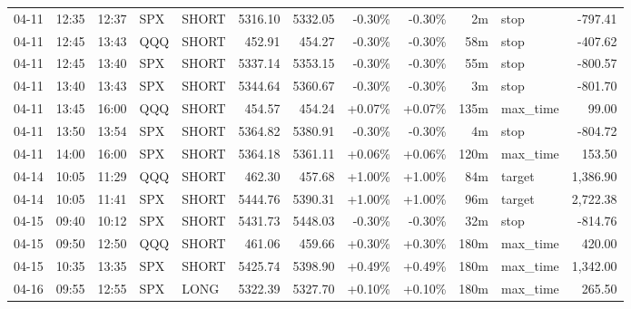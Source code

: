 \documentclass[11pt,a4paper,twoside]{article}
\begin{document}
\begin{center}
\begin{longtable}{>{\color{txtmain}}l l l l l r r r r r >{\color{txtmain}}l r}
04-11 & 12:35 & 12:37 & SPX & SHORT & 5316.10 & 5332.05 & \textcolor{lossred}{-0.30\%} & \textcolor{lossred}{-0.30\%} & 2m & stop & \textcolor{lossred}{-797.41} \\
04-11 & 12:45 & 13:43 & QQQ & SHORT & 452.91 & 454.27 & \textcolor{lossred}{-0.30\%} & \textcolor{lossred}{-0.30\%} & 58m & stop & \textcolor{lossred}{-407.62} \\
04-11 & 12:45 & 13:40 & SPX & SHORT & 5337.14 & 5353.15 & \textcolor{lossred}{-0.30\%} & \textcolor{lossred}{-0.30\%} & 55m & stop & \textcolor{lossred}{-800.57} \\
04-11 & 13:40 & 13:43 & SPX & SHORT & 5344.64 & 5360.67 & \textcolor{lossred}{-0.30\%} & \textcolor{lossred}{-0.30\%} & 3m & stop & \textcolor{lossred}{-801.70} \\
04-11 & 13:45 & 16:00 & QQQ & SHORT & 454.57 & 454.24 & \textcolor{wingreen}{+0.07\%} & \textcolor{wingreen}{+0.07\%} & 135m & max\_time & \textcolor{wingreen}{99.00} \\
04-11 & 13:50 & 13:54 & SPX & SHORT & 5364.82 & 5380.91 & \textcolor{lossred}{-0.30\%} & \textcolor{lossred}{-0.30\%} & 4m & stop & \textcolor{lossred}{-804.72} \\
04-11 & 14:00 & 16:00 & SPX & SHORT & 5364.18 & 5361.11 & \textcolor{wingreen}{+0.06\%} & \textcolor{wingreen}{+0.06\%} & 120m & max\_time & \textcolor{wingreen}{153.50} \\
04-14 & 10:05 & 11:29 & QQQ & SHORT & 462.30 & 457.68 & \textcolor{wingreen}{+1.00\%} & \textcolor{wingreen}{+1.00\%} & 84m & target & \textcolor{wingreen}{1,386.90} \\
04-14 & 10:05 & 11:41 & SPX & SHORT & 5444.76 & 5390.31 & \textcolor{wingreen}{+1.00\%} & \textcolor{wingreen}{+1.00\%} & 96m & target & \textcolor{wingreen}{2,722.38} \\
04-15 & 09:40 & 10:12 & SPX & SHORT & 5431.73 & 5448.03 & \textcolor{lossred}{-0.30\%} & \textcolor{lossred}{-0.30\%} & 32m & stop & \textcolor{lossred}{-814.76} \\
04-15 & 09:50 & 12:50 & QQQ & SHORT & 461.06 & 459.66 & \textcolor{wingreen}{+0.30\%} & \textcolor{wingreen}{+0.30\%} & 180m & max\_time & \textcolor{wingreen}{420.00} \\
04-15 & 10:35 & 13:35 & SPX & SHORT & 5425.74 & 5398.90 & \textcolor{wingreen}{+0.49\%} & \textcolor{wingreen}{+0.49\%} & 180m & max\_time & \textcolor{wingreen}{1,342.00} \\
04-16 & 09:55 & 12:55 & SPX & LONG & 5322.39 & 5327.70 & \textcolor{wingreen}{+0.10\%} & \textcolor{wingreen}{+0.10\%} & 180m & max\_time & \textcolor{wingreen}{265.50} \\

\end{longtable}
\end{center}
\end{document}
